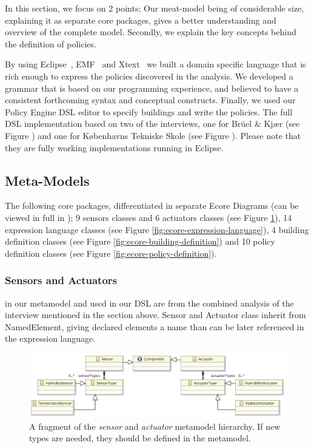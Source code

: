 In this section, we focus on 2 points; Our meat-model being of considerable size, explaining it as separate core packages, gives a better understanding and overview of the complete model. Secondly, we explain the key concepts behind the definition of policies.
 
By using Eclipse~\cite{eclipse}, EMF~\cite{emf} and Xtext~\cite{xtext} we built a domain specific language that is rich enough to express the policies discovered in the analysis. We developed a grammar that is based on our programming experience, and believed to have a consistent forthcoming syntax and conceptual constructs. Finally, we used our Policy Engine DSL editor to specify buildings and write the policies. The full DSL implementation based on two of the interviews, one for Br\"{u}el \& Kj\ae r (see Figure ) and one for K\o benhavns Tekniske Skole (see Figure ). Please note that they are fully working implementations running in Eclipse.

\subsection{Meta-Models}

The following core packages, differentiated in separate Ecore Diagrams (can be viewed in full in ); 9 sensors classes and 6 actuators classes (see Figure \ref{fig:ecore-sensors-actuators}), 14 expression language classes (see Figure \ref{fig:ecore-expression-language}), 4 building definition classes (see Figure \ref{fig:ecore-building-definition}) and 10 policy definition classes (see Figure \ref{fig:ecore-policy-definition}).

\subsubsection{Sensors and Actuators}
in our metamodel and used in our DSL are from the combined analysis of the interview mentioned in the section above. Sensor and Actuator class inherit from NamedElement, giving declared elements a name than can be later referenced in the expression language.
\begin{figure}[h]
	\centering
    \includegraphics[scale=.45]{ecore-sensors-actuators.png} 
	\caption{A fragment of the \textit{sensor} and \textit{actuator} metamodel hierarchy. If new types are needed, they should be defined in the metamodel.}
	\label{fig:ecore-sensors-actuators}
\end{figure}

